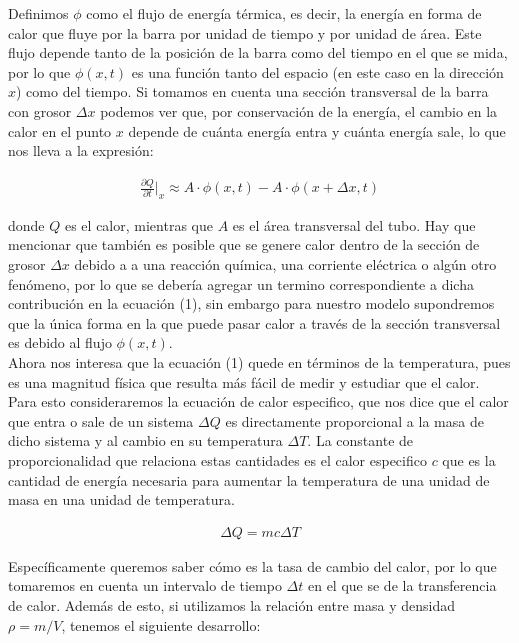 \documentclass[12pt]{article}
\begin{document}
\newpage

Definimos $\phi$ como el flujo de energía térmica, es decir, la energía en forma de calor que fluye por la barra por unidad de tiempo y por unidad de área. Este flujo depende tanto de la posición de la barra como del tiempo en el que se mida, por lo que $\phi(x,t)$ es una función tanto del espacio (en este caso en la dirección $x$) como del tiempo. Si tomamos en cuenta una sección transversal de la barra con grosor $\Delta x$ podemos ver que, por conservación de la energía, el cambio en la calor en el punto $x$ depende de cuánta energía entra y cuánta energía sale, lo que nos lleva a la expresión:

\begin{align}
    \frac{\partial Q}{\partial t}\Big|_x  \approx A\cdot\phi(x,t) - A\cdot\phi(x+\Delta x,t)
\end{align}

donde $Q$ es el calor, mientras que $A$ es el área transversal del tubo. Hay que mencionar que también es posible que se genere calor dentro de la sección de grosor $\Delta x$ debido a a una reacción química, una corriente eléctrica o algún otro fenómeno, por lo que se debería agregar un termino correspondiente a dicha contribución en la ecuación (1), sin embargo para nuestro modelo supondremos que la única forma en la que puede pasar calor a través de la sección transversal es debido al flujo $\phi(x,t)$. \\

Ahora nos interesa que la ecuación (1) quede en términos de la temperatura, pues es una magnitud física que resulta más fácil de medir y estudiar que el calor. Para esto consideraremos la ecuación de calor especifico, que nos dice que el calor que entra o sale de un sistema $\Delta Q$ es directamente proporcional a la masa de dicho sistema y al cambio en su temperatura $\Delta T$. La constante de proporcionalidad que relaciona estas cantidades es el calor especifico $c$ que es la cantidad de energía necesaria para aumentar la temperatura de una unidad de masa en una unidad de temperatura.

\begin{align}
    \Delta Q = mc\Delta T
\end{align}

Específicamente queremos saber cómo es la tasa de cambio del calor, por lo que tomaremos en cuenta un intervalo de tiempo $\Delta t$ en el que se de la transferencia de calor. Además de esto, si utilizamos la relación entre masa y densidad $\rho = m/V$, tenemos el siguiente desarrollo:
\end{document}
